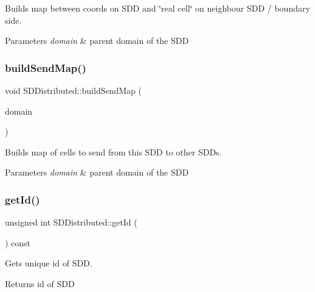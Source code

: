 Builds map between coords on S\+DD and \char`\"{}real cell\char`\"{} on neighbour S\+DD / boundary side. 


\begin{DoxyParams}{Parameters}
{\em domain} & parent domain of the S\+DD \\
\hline
\end{DoxyParams}
\mbox{\label{classSDDistributed_ae7695b6c9096e7a2f9c5fc16174aaae9}} 
\subsubsection{\texorpdfstring{build\+Send\+Map()}{buildSendMap()}}
{\footnotesize\ttfamily void S\+D\+Distributed\+::build\+Send\+Map (\begin{DoxyParamCaption}\item[{const \hyperlink{classDomain}{Domain} \&}]{domain }\end{DoxyParamCaption})}



Builds map of cells to send from this S\+DD to other S\+D\+Ds. 


\begin{DoxyParams}{Parameters}
{\em domain} & parent domain of the S\+DD \\
\hline
\end{DoxyParams}
\mbox{\label{classSDDistributed_a0ab71d942dca319b739390055942a96a}} 
\subsubsection{\texorpdfstring{get\+Id()}{getId()}\hspace{0.1cm}{\footnotesize\ttfamily [1/2]}}
{\footnotesize\ttfamily unsigned int S\+D\+Distributed\+::get\+Id (\begin{DoxyParamCaption}{ }\end{DoxyParamCaption}) const}



Gets unique id of S\+DD. 

\begin{DoxyReturn}{Returns}
id of S\+DD 
\end{DoxyReturn}
\mbox{\label{classSDDistributed_a0ab71d942dca319b739390055942a96a}} 
